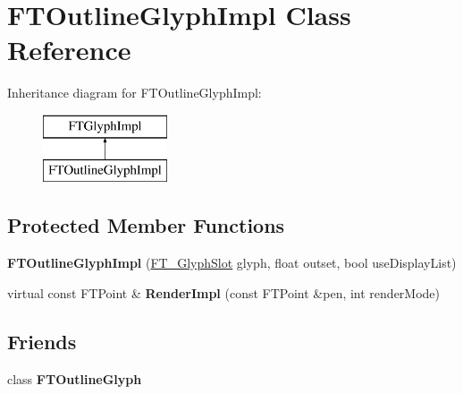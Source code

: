 \hypertarget{class_f_t_outline_glyph_impl}{\section{F\-T\-Outline\-Glyph\-Impl Class Reference}
\label{class_f_t_outline_glyph_impl}
}
Inheritance diagram for F\-T\-Outline\-Glyph\-Impl\-:\begin{figure}[H]
\begin{center}
\leavevmode
\includegraphics[height=2.000000cm]{class_f_t_outline_glyph_impl}
\end{center}
\end{figure}
\subsection*{Protected Member Functions}
\begin{DoxyCompactItemize}
\item 
\hypertarget{class_f_t_outline_glyph_impl_a0eac191ec3db6c8dbbf6956ded4342fa}{{\bfseries F\-T\-Outline\-Glyph\-Impl} (\hyperlink{struct_f_t___glyph_slot_rec__}{F\-T\-\_\-\-Glyph\-Slot} glyph, float outset, bool use\-Display\-List)}\label{class_f_t_outline_glyph_impl_a0eac191ec3db6c8dbbf6956ded4342fa}

\item 
\hypertarget{class_f_t_outline_glyph_impl_a554ed38dfe9a113804394c35e9ef9d35}{virtual const F\-T\-Point \& {\bfseries Render\-Impl} (const F\-T\-Point \&pen, int render\-Mode)}\label{class_f_t_outline_glyph_impl_a554ed38dfe9a113804394c35e9ef9d35}

\end{DoxyCompactItemize}
\subsection*{Friends}
\begin{DoxyCompactItemize}
\item 
\hypertarget{class_f_t_outline_glyph_impl_accb6ff0274a52a67e706edda49d6a201}{class {\bfseries F\-T\-Outline\-Glyph}}\label{class_f_t_outline_glyph_impl_accb6ff0274a52a67e706edda49d6a201}

\end{DoxyCompactItemize}
